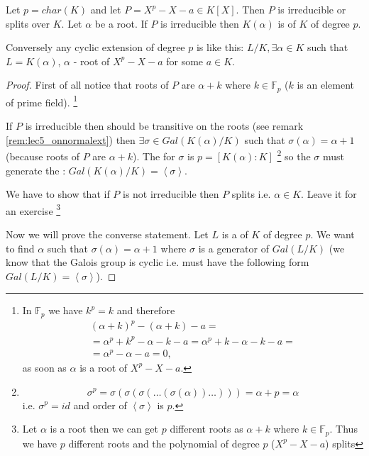 \begin{theorem}
  Let $p = char(K)$ and let
  $P = X^p - X - a \in K\left[X\right]$. Then $P$ is irreducible or
  splits over $K$. Let $\alpha$ be a root. If $P$ is irreducible then
  $K\left(\alpha\right)$ is  of $K$ of
  degree $p$.

  Conversely any cyclic extension of degree $p$ is like this: $L/K,
  \exists \alpha \in K$ such that $L = K\left(\alpha\right)$, $\alpha$
  - root of $X^p - X - a$ for some $a \in K$.
  \begin{proof}
    First of all notice that roots of $P$ are $\alpha + k$ where $k
    \in \mathbb{F}_p$ ($k$ is an element of prime field).
    \footnote{
      In $\mathbb{F}_p$ we have $k^p = k$ and therefore 
      \begin{eqnarray}
        \left(\alpha + k\right)^p -
        \left(\alpha + k\right) -a =
        \nonumber \\
        =\alpha^p + k^p - \alpha -k - a =
        \alpha^p + k - \alpha -k - a =
        \nonumber \\
        =
        \alpha^p - \alpha - a =0,
        \nonumber
      \end{eqnarray}
      as soon as $\alpha$ is a root of $X^p - X - a$.
    }

    If $P$ is irreducible then  should be
    transitive on the roots (see remark \ref{rem:lec5_onnormalext})  then
    $\exists \sigma \in Gal\left(K\left(\alpha\right)/K\right)$ such that
    $\sigma\left(\alpha\right) = \alpha + 1$ (because roots of $P$ are
    $\alpha + k$). The  for $\sigma$ is
    $p = \left[K\left(\alpha\right):K\right]$
    \footnote{
      \[
      \sigma^p = \sigma(\sigma(\sigma( \dots ( \sigma(\alpha) ) \dots
      ))) = \alpha + p = \alpha
      \]
      i.e. $\sigma^p = id$ and order of $\left<\sigma\right>$ is $p$.
    }
    so the $\sigma$ must
    generate the :
    $Gal\left(K\left(\alpha\right)/K\right) = \left<\sigma\right>$.

    We have to show that if $P$ is not irreducible then $P$ splits
    i.e. $\alpha \in K$. Leave it for an exercise
    \footnote{
      Let $\alpha$ is a root then we can get $p$ different roots as
      $\alpha + k$ where $k \in \mathbb{F}_p$. Thus we have $p$
      different roots and the polynomial of degree $p$ ($X^p - X -a$)
      splits 
    }

    Now we will prove the converse statement. Let $L$ is a
     of $K$ of degree $p$. We want to
    find $\alpha$ such that $\sigma\left(\alpha\right) = \alpha + 1$
    where $\sigma$ is a generator of $Gal\left(L/K\right)$ (we know
    that the Galois group is cyclic i.e. must have the following form
    $Gal\left(L/K\right) = \left<\sigma\right>$).


\end{proof}
\end{theorem}
